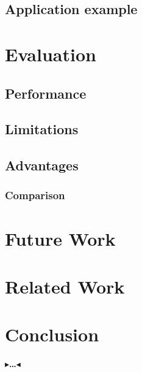 \documentclass[twoside,11pt,openright]{report}
\newcommand{\todo}[1]{{\color[rgb]{.5,0,0}\textbf{$\blacktriangleright$#1$\blacktriangleleft$}}}
\begin{document}
\section{Application example}


\chapter{Evaluation}
\section{Performance}
\section{Limitations}
\section{Advantages}
\subsection{Comparison}


\chapter{Future Work}


\chapter{Related Work}


\chapter{Conclusion}
\label{ch:conclusion}

\todo{\dots}


\end{document}
